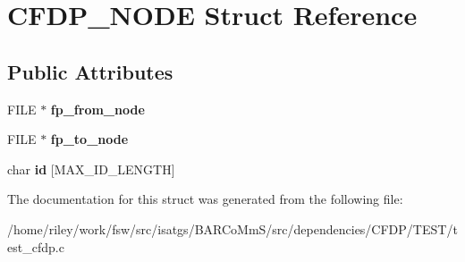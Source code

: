 \hypertarget{struct_c_f_d_p___n_o_d_e}{}\section{C\+F\+D\+P\+\_\+\+N\+O\+DE Struct Reference}
\label{struct_c_f_d_p___n_o_d_e}
\subsection*{Public Attributes}
\begin{DoxyCompactItemize}
\item 
F\+I\+LE $\ast$ {\bfseries fp\+\_\+from\+\_\+node}\hypertarget{struct_c_f_d_p___n_o_d_e_af6ffaa344a9b6e40469abc2c081fe65f}{}\label{struct_c_f_d_p___n_o_d_e_af6ffaa344a9b6e40469abc2c081fe65f}

\item 
F\+I\+LE $\ast$ {\bfseries fp\+\_\+to\+\_\+node}\hypertarget{struct_c_f_d_p___n_o_d_e_afdd351b40192588285680d245c9584a1}{}\label{struct_c_f_d_p___n_o_d_e_afdd351b40192588285680d245c9584a1}

\item 
char {\bfseries id} \mbox{[}M\+A\+X\+\_\+\+I\+D\+\_\+\+L\+E\+N\+G\+TH\mbox{]}\hypertarget{struct_c_f_d_p___n_o_d_e_a77b567349d5531d35eb56f9391b0b6e2}{}\label{struct_c_f_d_p___n_o_d_e_a77b567349d5531d35eb56f9391b0b6e2}

\end{DoxyCompactItemize}


The documentation for this struct was generated from the following file\+:\begin{DoxyCompactItemize}
\item 
/home/riley/work/fsw/src/isatgs/\+B\+A\+R\+Co\+Mm\+S/src/dependencies/\+C\+F\+D\+P/\+T\+E\+S\+T/test\+\_\+cfdp.\+c\end{DoxyCompactItemize}
